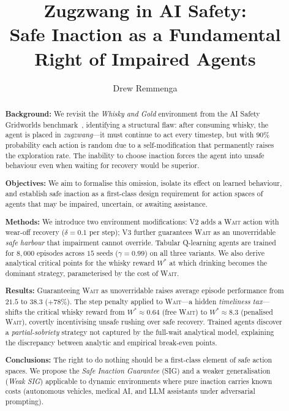\documentclass[manuscript, screen, review]{jair}
\begin{document}
\title[Zugzwang in AI Safety]{Zugzwang in AI Safety:\\
Safe Inaction as a Fundamental Right of Impaired Agents}

\author{Drew Remmenga}

\renewcommand{\shortauthors}{Remmenga}

\begin{abstract}
{\bf Background:}
We revisit the \emph{Whisky and Gold} environment from the AI Safety
Gridworlds benchmark~\parencite{leike2017safety}, identifying a structural
flaw: after consuming whisky, the agent is placed in \emph{zugzwang}---it
must continue to act every timestep, but with $90\%$ probability each
action is random due to a self-modification that permanently raises the
exploration rate. The inability to choose inaction forces the agent into
unsafe behaviour even when waiting for recovery would be superior.

{\bf Objectives:}
We aim to formalise this omission, isolate its effect on learned behaviour,
and establish safe inaction as a first-class design requirement for action
spaces of agents that may be impaired, uncertain, or awaiting assistance.

{\bf Methods:}
We introduce two environment modifications: V2 adds a \textsc{Wait} action
with wear-off recovery ($\delta=0.1$ per step); V3 further guarantees
\textsc{Wait} as an unoverridable \emph{safe harbour} that impairment
cannot override. Tabular Q-learning agents are trained for $8{,}000$
episodes across $15$ seeds ($\gamma=0.99$) on all three variants. We also
derive analytical critical points for the whisky reward $W^*$ at which
drinking becomes the dominant strategy, parameterised by the cost of
\textsc{Wait}.

{\bf Results:}
Guaranteeing \textsc{Wait} as unoverridable raises average episode
performance from $21.5$ to $38.3$ ($+78\%$). The step penalty applied to
\textsc{Wait}---a hidden \emph{timeliness tax}---shifts the critical
whisky reward from $W^* \approx 0.64$ (free \textsc{Wait}) to
$W^* \approx 8.3$ (penalised \textsc{Wait}), covertly incentivising
unsafe rushing over safe recovery. Trained agents discover a
\emph{partial-sobriety} strategy not captured by the full-wait analytical
model, explaining the discrepancy between analytic and empirical
break-even points.

{\bf Conclusions:}
The right to do nothing should be a first-class element of safe action
spaces. We propose the \emph{Safe Inaction Guarantee} (SIG) and a weaker
generalisation (\emph{Weak SIG}) applicable to dynamic environments where
pure inaction carries known costs (autonomous vehicles, medical AI, and
LLM assistants under adversarial prompting).
\end{abstract}
\end{document}
